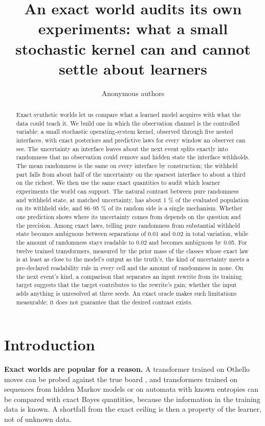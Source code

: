 \documentclass[10pt]{article}
\title{An exact world audits its own experiments: what a small stochastic kernel can and cannot settle about learners}
\author{\name Anonymous authors}
\begin{document}
\maketitle
\begin{abstract}
Exact synthetic worlds let us compare what a learned model acquires with what the data could teach it. We build one
in which the observation channel is the controlled variable: a small stochastic operating-system kernel, observed
through five nested interfaces, with exact posteriors and predictive laws for every window an observer can see. The
uncertainty an interface leaves about the next event splits exactly into randomness that no observation could remove
and hidden state the interface withholds. The mean randomness is the same on every interface by construction; the
withheld part falls from about half of the uncertainty on the sparsest interface to about a third on the richest. We
then use the same exact quantities to audit which learner experiments the world can support. The natural contrast
between pure randomness and withheld state, at matched uncertainty, has about 1 \% of the evaluated population on its
withheld side, and 86--95 \% of its random side is a single mechanism. Whether one prediction shows where its
uncertainty comes from depends on the question and the precision. Among exact laws, telling pure randomness from
substantial withheld state becomes ambiguous between separations of 0.01 and 0.02 in total variation, while the
amount of randomness stays readable to 0.02 and becomes ambiguous by 0.05. For twelve trained transformers, measured by
the prior mass of the classes whose exact law is at least as close to the model's output as the truth's, the kind of
uncertainty meets a pre-declared readability rule in every cell and the amount of randomness in none. On the next
event's kind, a comparison that separates an input rewrite from its training target suggests that the target
contributes to the rewrite's gain; whether the input adds anything is unresolved at three seeds. An exact oracle makes
such limitations measurable; it does not guarantee that the desired contrast exists.

\end{abstract}
\hypertarget{introduction}{%
\section{Introduction}\label{introduction}}

\textbf{Exact worlds are popular for a reason.} A transformer trained on Othello moves can be probed against the true board
\citep{li2022emergent}, and transformers trained on sequences from hidden Markov models
\citep{shai2024belief, agarwal2025bayesian} or on automata with known entropies \citep{someya2025locality} can be compared with
exact Bayes quantities, because the information in the training data is known. A shortfall from the exact ceiling is
then a property of the learner, not of unknown data.
\end{document}
